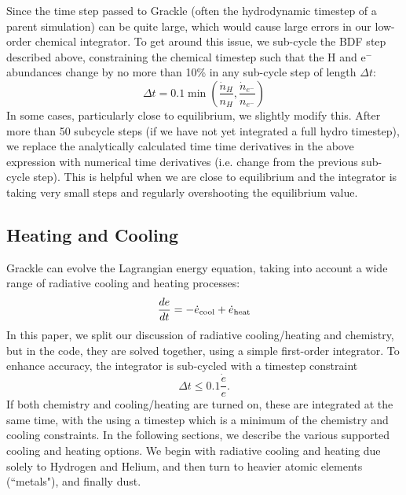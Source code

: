 Since the time step passed to Grackle (often the hydrodynamic timestep of a parent simulation) can be quite large, which would cause large errors in our low-order chemical integrator.  To get around this issue, we sub-cycle the BDF step described above, constraining the chemical timestep such that the H and e$^-$ abundances change by no more than 10\% in any sub-cycle step of length $\Delta t$:
\begin{equation}
\Delta t = 0.1 \min \left( \frac{\dot{n}_H}{n_H} , \frac{\dot{n}_{e^-}}{n_{e^-}} \right)
\end{equation}
In some cases, particularly close to equilibrium, we slightly modify this.  After more than 50 subcycle steps (if we have not yet integrated a full hydro timestep), we replace the analytically calculated time time derivatives in the above expression with numerical time derivatives (i.e. change from the previous sub-cycle step).  This is helpful when we are close to equilibrium and the integrator is taking very small steps and regularly overshooting the equilibrium value.  


\subsection{Heating and Cooling} \label{Cooling}

Grackle can evolve the Lagrangian energy equation, taking into account a wide range of radiative cooling and heating processes:
\begin{equation}
\frac{de}{dt} = - \dot{e}_{\rm cool} + \dot{e}_{\rm heat}
\end{equation}
In this paper, we split our discussion of radiative cooling/heating and chemistry, but in the code, they are solved together, using a simple first-order integrator.  To enhance accuracy, the integrator is sub-cycled with a timestep constraint 
\begin{equation}
\Delta t \leq 0.1 \frac{\dot{e}}{e}.
\end{equation}
If both chemistry and cooling/heating are turned on, these are integrated at the same time, with the  using a timestep which is a minimum of the chemistry and cooling constraints.  In the following sections, we describe the various supported cooling and heating options.  We begin with radiative cooling and heating due solely to Hydrogen and Helium, and then turn to heavier atomic elements (``metals"), and finally dust. 

